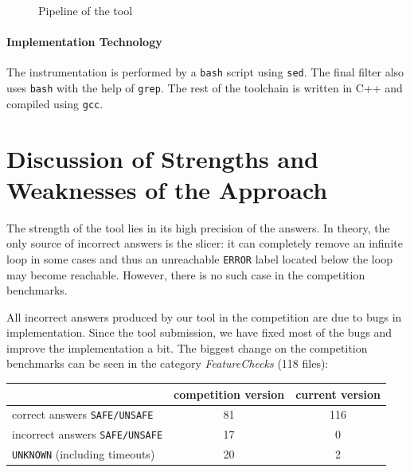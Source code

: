 \documentclass[10pt]{llncs}
\begin{document}
\begin{figure}[tb]
\begin{center}

\end{center}
  \caption{Pipeline of the tool}
\label{fig:pipeline}
\end{figure}

\paragraph{Implementation Technology} The instrumentation is performed by a
\texttt{bash} script using \texttt{sed}. The final filter also uses
\texttt{bash} with the help of \texttt{grep}. The rest of the toolchain is
written in C++ and compiled using \texttt{gcc}.


\section{Discussion of Strengths and Weaknesses of the Approach}

The strength of the tool lies in its high precision of the answers. In theory,
the only source of incorrect answers is the slicer: it can completely remove
an infinite loop in some cases and thus an unreachable \texttt{ERROR} label
located below the loop may become reachable. However, there is no such case
in the competition benchmarks. 

All incorrect answers produced by our tool in the competition are due to
bugs in implementation.
Since the tool submission, we have fixed most of the bugs and improve the
implementation a bit. The biggest change on the competition benchmarks can be
seen in the category \emph{FeatureChecks} (118 files):

\begin{center}
  \setlength{\tabcolsep}{3pt}
  \begin{tabular}{|l|c|c|}
    \hline
    & competition version & current version \\ \hline 
    correct answers \texttt{SAFE/UNSAFE} & 81 & 116 \\ \hline
    incorrect answers \texttt{SAFE/UNSAFE} & 17 & 0 \\ \hline
    \texttt{UNKNOWN} (including timeouts) & 20 & 2 \\ \hline
  \end{tabular}
\end{center}
\end{document}
